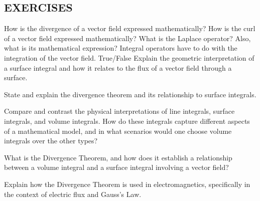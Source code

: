 \begin{mdframed}[ backgroundcolor=lightblue, linewidth=1pt, hidealllines=true]
\section{EXERCISES}
\begin{ExerciseList}
	\Exercise[label={ex171}] 
	How is the divergence of a vector field expressed mathematically?
 \Exercise[label={ex172}] 
		 How is the curl of a vector field expressed mathematically?
	\Exercise[label={ex173}] 
	 What is the Laplace operator? Also, what is its mathematical expression?
	\Exercise[label={ex174}]  Integral operators have to do with the integration of the vector field. True/False
		\Exercise[label={ex175}] 
	Explain the geometric interpretation of a surface integral and how it relates to the flux of a vector field through a surface.
	

		\Exercise[label={ex176}] 
	State and explain the divergence theorem and its relationship to surface integrals.
	
%	
	
	

	
	
	\Exercise[label={ex178}] 
	 Compare and contrast the physical interpretations of line integrals, surface integrals, and volume integrals. How do these integrals capture different aspects of a mathematical model, and in what scenarios would one choose volume integrals over the other types?
	
	
	
	\Exercise[label={ex179}] 
	 What is the Divergence Theorem, and how does it establish a relationship between a volume integral and a surface integral involving a vector field?
	
	
	
	\Exercise[label={ex1710}] 
	 Explain how the Divergence Theorem is used in electromagnetics, specifically in the context of electric flux and Gauss's Law.
	
	
	

\end{ExerciseList}
\end{mdframed}
